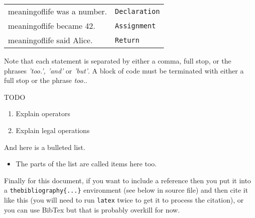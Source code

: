 \documentclass[a4wide, 11pt]{article}
\newcommand{\tab}{\hspace*{2em}}
\begin{document}
\begin{table}[h]
\begin{tabular}{l l}
\tab meaningoflife was a number. & \verb|Declaration| \\
\tab meaningoflife became 42. & \verb|Assignment| \\
\tab meaningoflife said Alice. & \verb|Return| \\
\end{tabular}
\end{table}
  
Note that each statement is separated by either a comma, full stop, or the 
phrases \emph{'too.', 'and'} or \emph{'but'}. A block of code must be 
terminated with either a full stop or the phrase \emph{too.}.

TODO

\begin{enumerate}
    \item
    Explain operators 
    \item
    Explain legal operations    
    
    
\end{enumerate}

And here is a bulleted list.

\begin{itemize}

    \item
    The parts of the list are called items here too.
    
\end{itemize}

Finally for this document, if you want to include a reference
then you put it into a \texttt{thebibliography\{...\}}
environment (see below in source file) and then 
cite it like this \cite{lamport94}
(you will need to run \texttt{latex} twice to get it to process the citation),
or you can use BibTex but that is probably overkill for now.

\end{document}
